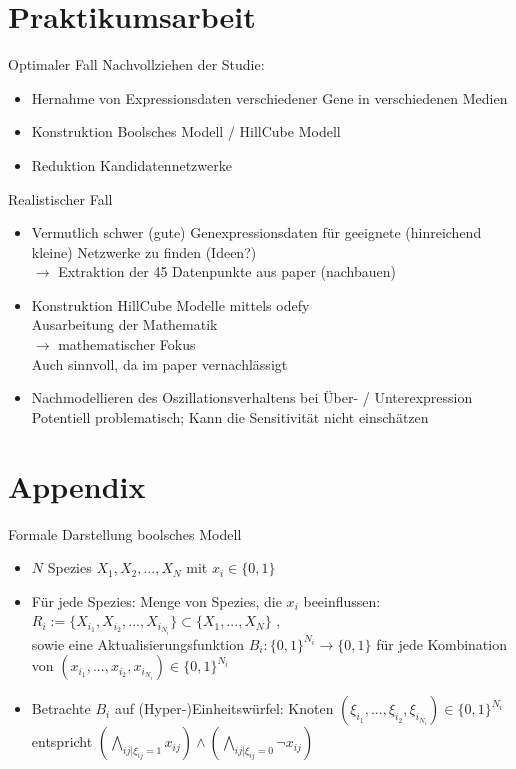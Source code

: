 \documentclass[]{beamer}
\begin{document}
\section{Praktikumsarbeit}

\begin{frame}{Optimaler Fall}
Nachvollziehen der Studie:
\begin{itemize}
	\item Hernahme von Expressionsdaten verschiedener Gene in verschiedenen Medien
	\pause
	\item Konstruktion Boolsches Modell / HillCube Modell
	\pause
	\item Reduktion Kandidatennetzwerke
\end{itemize}
\end{frame}

\begin{frame}{Realistischer Fall}
\begin{itemize}
	\item Vermutlich schwer (gute) Genexpressionsdaten f\"ur geeignete (hinreichend kleine) Netzwerke zu finden (Ideen?)
	\pause
	\\ $\rightarrow$ Extraktion der 45 Datenpunkte aus paper (nachbauen)
	\pause
	\item Konstruktion HillCube Modelle mittels odefy
	\pause
	\\ Ausarbeitung der Mathematik
	\pause
	\\ $\rightarrow$ mathematischer Fokus
	\pause
	\\ Auch sinnvoll, da im paper vernachl\"assigt
	\pause
	\item Nachmodellieren des Oszillationsverhaltens bei \"Uber- / Unterexpression
	\pause
	\\ Potentiell problematisch; Kann die Sensitivit\"at nicht einsch\"atzen
\end{itemize}
\end{frame}

\section{Appendix}

\begin{frame}{Formale Darstellung boolsches Modell}
\begin{itemize}
	\item $N$ Spezies $X_{1}, X_{2},..., X_{N}$ mit $x_{i} \in \{0,1\}$
	\pause
	\item F\"ur jede Spezies: Menge von Spezies, die $x_{i}$ beeinflussen: $R_{i} := \{X_{i_{1}},X_{i_{2}}, ...,  X_{i_{N_{i}}}\} \subset \{X_{1},...,X_{N}\}$
	\pause
	, \\ sowie eine Aktualisierungsfunktion $B_{i}: \{0,1\}^{N_{i}} \to \{0,1\}$ f\"ur jede Kombination von $(x_{i_{1}}, ..., x_{i_{2}}, x_{i_{N_{i}}}) \in \{0,1\}^{N_{i}}$
	\pause
	\item Betrachte $B_{i}$ auf (Hyper-)Einheitsw\"urfel: Knoten $(\xi_{i_{1}}, ..., \xi_{i_{2}}, \xi_{i_{N_{i}}}) \in \{0,1\}^{N_{i}}$ entspricht $(\bigwedge_{ij | \xi_{ij} = 1} x_{ij}) \wedge (\bigwedge_{ij | \xi_{ij} = 0} \neg x_{ij}) $
\end{itemize}
\end{frame}
\end{document}
